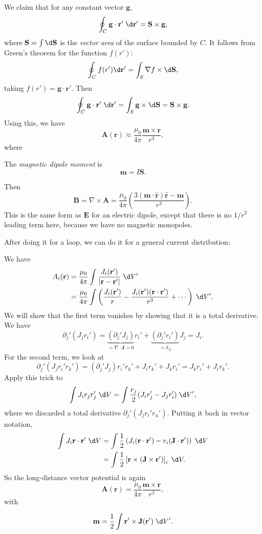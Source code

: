 \documentclass[a4paper]{article}
\begin{document}
\begin{eg}
  We claim that for any constant vector $\mathbf{g}$,
  \[
    \oint_C \mathbf{g}\cdot \mathbf{r}' \;\d \mathbf{r}' = \mathbf{S}\times \mathbf{g},
  \]
  where $\mathbf{S} = \int \d \mathbf{\mathbf{S}}$ is the \emph{vector area} of the surface bounded by $C$. It follows from Green's theorem for the function $f(r')$:
  \[
    \oint_C f(r')\d \mathbf{r}' = \int_S \nabla f\times\d \mathbf{S},
  \]
  taking $f(r') = \mathbf{g}\cdot \mathbf{r}'$. Then
  \[
    \oint_C \mathbf{g}\cdot \mathbf{r}'\;\d \mathbf{r}' = \int_S \mathbf{g}\times \d \mathbf{S} = \mathbf{S}\times \mathbf{g}.
  \]
  Using this, we have
  \[
    \mathbf{A}(\mathbf{r}) \approx \frac{\mu_0}{4\pi}\frac{\mathbf{m}\times \mathbf{r}}{r^3},
  \]
  where
  \begin{defi} The \emph{magnetic dipole moment} is
    \[
      \mathbf{m} = I\mathbf{S}.
    \]
  \end{defi}
  Then
  \[
    \mathbf{B} = \nabla\times \mathbf{A} = \frac{\mu_0}{4\pi}\left(\frac{3(\mathbf{m}\cdot \hat{\mathbf{r}})\hat{\mathbf{r}} - \mathbf{m}}{r^3}\right).
  \]
  This is the same form as $\mathbf{E}$ for an electric dipole, except that there is no $1/r^2$ leading term here, because we have no magnetic monopoles.
\end{eg}

After doing it for a loop, we can do it for a general current distribution:
\begin{eg}
  We have
  \begin{align*}
    A_i(\mathbf{r}) &= \frac{\mu_0}{4\pi}\int \frac{J_i(\mathbf{r}')}{|\mathbf{r} - \mathbf{r}'|}\;\d V'\\
    &= \frac{\mu_0}{4\pi}\int\left(\frac{J_i(\mathbf{r}')}{r} - \frac{J_i(\mathbf{r}')(\mathbf{r}\cdot \mathbf{r}')}{r^3} + \cdots\right)\;\d V'.
  \end{align*}
  We will show that the first term vanishes by showing that it is a total derivative. We have
  \[
    \partial_j'(J_jr_i') = \underbrace{(\partial_j'J_j)}_{=\nabla\cdot \mathbf{J} = 0}r_i' + \underbrace{(\partial_j'r_i')}_{=\delta_{ij}}J_j = J_i.
  \]
  For the second term, we look at
  \[
    \partial_j' (J_jr_i'r_k') = (\partial_j'J_j)r_i'r_k' + J_ir_k' + J_kr_i' =J_kr_i' + J_ir_k'.
  \]
  Apply this trick to
  \[
    \int J_ir_jr'_j \;\d V = \int \frac{r_j}{2}(J_i r_j' - J_j r'_i)\;\d V',
  \]
  where we discarded a total derivative $\partial_j'(J_jr_i'r_u')$. Putting it back in vector notation,
  \begin{align*}
    \int J_i\mathbf{r}\cdot \mathbf{r}'\;\d V &= \int\frac{1}{2}\left(J_i(\mathbf{r}\cdot \mathbf{r}') - r_i(\mathbf{J}\cdot \mathbf{r}')\right)\;\d V\\
    &= \int \frac{1}{2}\left[\mathbf{r}\times (\mathbf{J}\times \mathbf{r}')\right]_i\;\d V.
  \end{align*}
  So the long-distance vector potential is again
  \[
    \mathbf{A} (\mathbf{r}) = \frac{\mu_0}{4\pi}\frac{\mathbf{m}\times \mathbf{r}}{r^3},
  \]
  with
  \begin{defi}
    \[
      \mathbf{m} = \frac{1}{2}\int \mathbf{r}'\times \mathbf{J}(\mathbf{r}')\;\d V'.
    \]
  \end{defi}
\end{eg}
\end{document}
